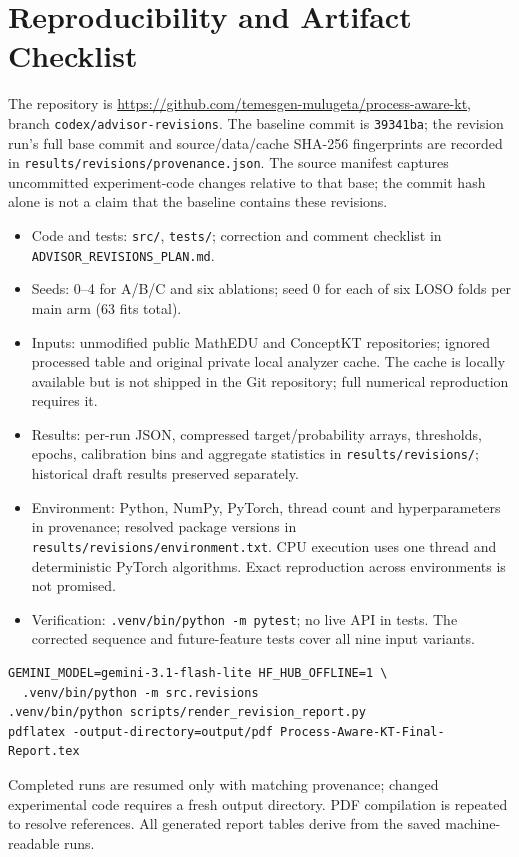\documentclass[11pt]{article}
\newcommand{\code}[1]{\texttt{\small #1}}
\begin{document}
\section{Reproducibility and Artifact Checklist}
The repository is \url{https://github.com/temesgen-mulugeta/process-aware-kt}, branch \code{codex/advisor-revisions}. The baseline commit is \code{39341ba}; the revision run's full base commit and source/data/cache SHA-256 fingerprints are recorded in \code{results/revisions/provenance.json}. The source manifest captures uncommitted experiment-code changes relative to that base; the commit hash alone is not a claim that the baseline contains these revisions.
\begin{itemize}[leftmargin=1.4em,itemsep=2pt]
\item Code and tests: \code{src/}, \code{tests/}; correction and comment checklist in \code{ADVISOR\_REVISIONS\_PLAN.md}.
\item Seeds: 0--4 for A/B/C and six ablations; seed 0 for each of six LOSO folds per main arm (63 fits total).
\item Inputs: unmodified public MathEDU and ConceptKT repositories; ignored processed table and original private local analyzer cache. The cache is locally available but is not shipped in the Git repository; full numerical reproduction requires it.
\item Results: per-run JSON, compressed target/probability arrays, thresholds, epochs, calibration bins and aggregate statistics in \code{results/revisions/}; historical draft results preserved separately.
\item Environment: Python, NumPy, PyTorch, thread count and hyperparameters in provenance; resolved package versions in \code{results/revisions/environment.txt}. CPU execution uses one thread and deterministic PyTorch algorithms. Exact reproduction across environments is not promised.
\item Verification: \code{.venv/bin/python -m pytest}; no live API in tests. The corrected sequence and future-feature tests cover all nine input variants.
\end{itemize}
\begin{lstlisting}
GEMINI_MODEL=gemini-3.1-flash-lite HF_HUB_OFFLINE=1 \
  .venv/bin/python -m src.revisions
.venv/bin/python scripts/render_revision_report.py
pdflatex -output-directory=output/pdf Process-Aware-KT-Final-Report.tex
\end{lstlisting}
Completed runs are resumed only with matching provenance; changed experimental code requires a fresh output directory. PDF compilation is repeated to resolve references. All generated report tables derive from the saved machine-readable runs.
\end{document}
